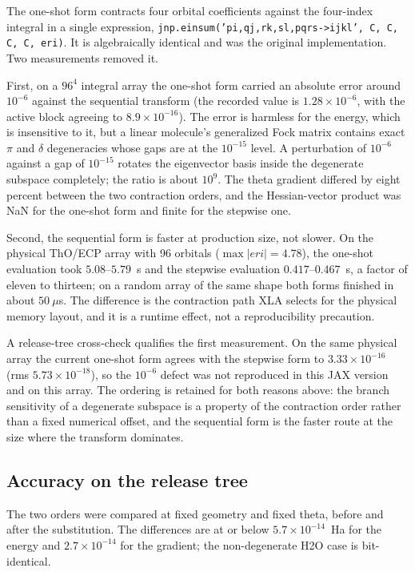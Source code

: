 The one-shot form contracts four orbital coefficients against the
four-index integral in a single expression,
\texttt{jnp.einsum('pi,qj,rk,sl,pqrs->ijkl', C, C, C, C, eri)}.  It
is algebraically identical and was the original implementation.  Two
measurements removed it.

First, on a $96^4$ integral array the one-shot form carried an absolute
error around $10^{-6}$ against the sequential transform (the recorded
value is $1.28\times10^{-6}$, with the active block agreeing to
$8.9\times10^{-16}$).  The error is harmless for the energy, which is
insensitive to it, but a linear molecule's generalized Fock matrix
contains exact $\pi$ and $\delta$ degeneracies whose gaps are at the
$10^{-15}$ level.  A perturbation of $10^{-6}$ against a gap of
$10^{-15}$ rotates the eigenvector basis inside the degenerate subspace
completely; the ratio is about $10^9$.  The theta gradient differed by
eight percent between the two contraction orders, and the
Hessian-vector product was NaN for the one-shot form and finite for the
stepwise one.

Second, the sequential form is faster at production size, not slower.
On the physical ThO/ECP array with 96 orbitals ($\max|eri| = 4.78$),
the one-shot evaluation took $5.08$--$5.79$~s and the stepwise
evaluation $0.417$--$0.467$~s, a factor of eleven to thirteen; on a
random array of the same shape both forms finished in about
$50~\mu$s.  The difference is the contraction path XLA selects for the
physical memory layout, and it is a runtime effect, not a
reproducibility precaution.

A release-tree cross-check qualifies the first measurement.  On the
same physical array the current one-shot form agrees with the stepwise
form to $3.33\times10^{-16}$ (rms $5.73\times10^{-18}$), so the
$10^{-6}$ defect was not reproduced in this JAX version and on this
array.  The ordering is retained for both reasons above: the branch
sensitivity of a degenerate subspace is a property of the contraction
order rather than a fixed numerical offset, and the sequential form is
the faster route at the size where the transform dominates.

\subsection{Accuracy on the release tree}

The two orders were compared at fixed geometry and fixed theta, before
and after the substitution.  The differences are at or below
$5.7\times10^{-14}$~Ha for the energy and $2.7\times10^{-14}$ for the
gradient; the non-degenerate H2O case is bit-identical.

